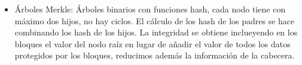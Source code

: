 \begin{itemize}
	\item Árboles Merkle: Árboles binarios con funciones hash, cada nodo tiene con máximo dos hijos, no hay ciclos. El cálculo de los hash de los padres se hace combinando los hash de los hijos. La integridad se obtiene inclueyendo en los bloques el valor del nodo raíz en lugar de añadir el valor de todos los datos protegidos por los bloques, reducimos además la información de la cabecera.
\end{itemize}


